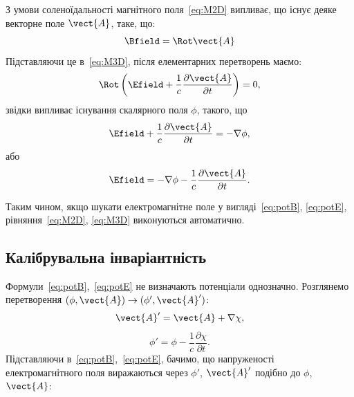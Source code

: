З умови соленоїдальності магнітного поля~\eqref{eq:M2D} випливає, що існує деяке векторне поле $\vect{A}$, таке, що:
\begin{equation}\label{eq:potB}
	\Bfield = \Rot\vect{A}
\end{equation}
Підставляючи це в~\eqref{eq:M3D}, після елементарних перетворень маємо:
\begin{equation*}
	\Rot \left( \Efield + \frac{1}{c} \frac{\partial \vect{A}}{\partial t}\right)  = 0,
\end{equation*}
звідки випливає існування скалярного поля $\phi$, такого, що
\begin{equation*}
	\Efield  + \frac{1}{c} \frac{\partial \vect{A}}{\partial t} = - \nabla \phi,
\end{equation*}
або
\begin{equation}\label{eq:potE}
	\Efield  = - \nabla \phi - \frac{1}{c} \frac{\partial \vect{A}}{\partial t}.
\end{equation}

Таким чином, якщо шукати електромагнітне поле у вигляді~\eqref{eq:potB}, \eqref{eq:potE}, рівняння~\eqref{eq:M2D},
\eqref{eq:M3D} виконуються автоматично.




\subsection*{Калібрувальна інваріантність}

Формули~\eqref{eq:potB},~\eqref{eq:potE} не визначають потенціали однозначно. Розглянемо перетворення $(\phi, \vect{A})
\to (\phi', \vect{A}')$:
\begin{equation}\label{eq:A'}
	\vect{A}' = \vect{A} + \nabla \chi,
\end{equation}
\begin{equation}\label{eq:phi'}
	\phi' = \phi - \frac{1}{c} \frac{\partial \chi}{\partial t}.
\end{equation}
Підставляючи в~\eqref{eq:potB},~\eqref{eq:potE}, бачимо, що напруженості електромагнітного поля виражаються через
$\phi'$, $\vect{A}'$ подібно до $\phi$, $\vect{A}$:

